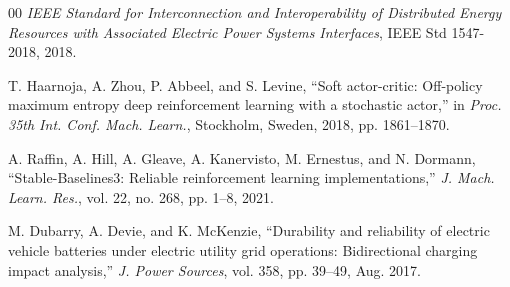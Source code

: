 \documentclass[conference,a4paper]{IEEEtran}
\begin{document}
\begin{thebibliography}{00}
 \emph{IEEE Standard for Interconnection and Interoperability of
Distributed Energy Resources with Associated Electric Power Systems Interfaces}, IEEE Std
1547-2018, 2018.

 T. Haarnoja, A. Zhou, P. Abbeel, and S. Levine, ``Soft
actor-critic: Off-policy maximum entropy deep reinforcement learning with a stochastic
actor,'' in \emph{Proc. 35th Int. Conf. Mach. Learn.}, Stockholm, Sweden, 2018, pp.
1861--1870.

 A. Raffin, A. Hill, A. Gleave, A. Kanervisto, M. Ernestus, and N.
Dormann, ``Stable-Baselines3: Reliable reinforcement learning implementations,'' \emph{J.
Mach. Learn. Res.}, vol. 22, no. 268, pp. 1--8, 2021.

 M. Dubarry, A. Devie, and K. McKenzie, ``Durability and reliability
of electric vehicle batteries under electric utility grid operations: Bidirectional charging
impact analysis,'' \emph{J. Power Sources}, vol. 358, pp. 39--49, Aug. 2017.

\end{thebibliography}
\end{document}
